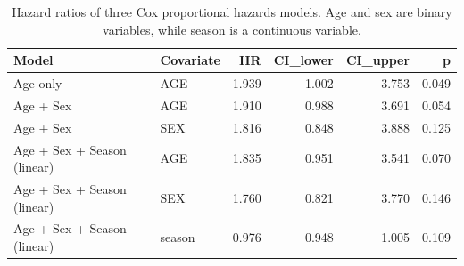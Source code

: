 \begin{table}[t]
    \centering
    \captionsetup{font=scriptsize}
    \caption{Hazard ratios of three Cox proportional hazards models. Age and sex are binary variables, while season is a continuous variable.}
    \label{table:hazard_ratios}
    \scriptsize
    \begin{tabular}{llrrrr}
        \toprule
        Model                       & Covariate & HR    & CI\_lower & CI\_upper & p     \\
        \midrule
        Age only                    & AGE       & 1.939 & 1.002     & 3.753     & 0.049 \\
        \addlinespace
        Age + Sex                   & AGE       & 1.910 & 0.988     & 3.691     & 0.054 \\
        Age + Sex                   & SEX       & 1.816 & 0.848     & 3.888     & 0.125 \\
        \addlinespace
        Age + Sex + Season (linear) & AGE       & 1.835 & 0.951     & 3.541     & 0.070 \\
        Age + Sex + Season (linear) & SEX       & 1.760 & 0.821     & 3.770     & 0.146 \\
        Age + Sex + Season (linear) & season    & 0.976 & 0.948     & 1.005     & 0.109 \\
        \bottomrule
    \end{tabular}
\end{table}
